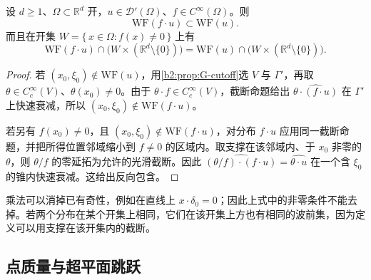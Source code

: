 \begin{proposition}[光滑乘法与波前集]\label{b2:prop:G-smooth-multiplication}
设 \(d\ge1\)、\(\Omega\subset\mathbb R^d\) 开，\(u\in\mathcal D'(\Omega)\)、\(f\in C^\infty(\Omega)\)。则
\[
 \mathrm{WF}(f\cdot u)\subset\mathrm{WF}(u).
\]
而且在开集 \(W=\{\,x\in\Omega:f(x)\ne0\,\}\) 上有
\[
 \mathrm{WF}(f\cdot u)\cap
       \bigl(W\times(\mathbb R^d\setminus\{0\})\bigr)
 =\mathrm{WF}(u)\cap
       \bigl(W\times(\mathbb R^d\setminus\{0\})\bigr).
\]
\end{proposition}
\begin{proof}
若 \((x_0,\xi_0)\notin\mathrm{WF}(u)\)，用\cref{b2:prop:G-cutoff}选 \(V\) 与 \(\Gamma'\)，再取 \(\theta\in C_c^\infty(V)\)、\(\theta(x_0)\ne0\)。由于 \(\theta\cdot f\in C_c^\infty(V)\)，截断命题给出
\(\widehat{\theta\cdot(f\cdot u)}\) 在 \(\Gamma'\) 上快速衰减，所以 \((x_0,\xi_0)\notin\mathrm{WF}(f\cdot u)\)。

若另有 \(f(x_0)\ne0\)，且 \((x_0,\xi_0)\notin\mathrm{WF}(f\cdot u)\)，对分布 \(f\cdot u\) 应用同一截断命题，并把所得位置邻域缩小到 \(f\ne0\) 的区域内。取支撑在该邻域内、于 \(x_0\) 非零的 \(\theta\)，则 \(\theta/f\) 的零延拓为允许的光滑截断。因此
\(\widehat{(\theta/f)\cdot(f\cdot u)}=\widehat{\theta\cdot u}\) 在一个含 \(\xi_0\) 的锥内快速衰减。这给出反向包含。
\end{proof}
乘法可以消掉已有奇性，例如在直线上 \(x\cdot\delta_0=0\)；因此上式中的非零条件不能去掉。若两个分布在某个开集上相同，它们在该开集上方也有相同的波前集，因为定义可以用支撑在该开集内的截断。

\subsection{点质量与超平面跳跃}
\label{b2:subsec:G0403}

